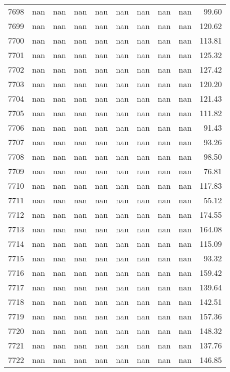\begin{tabular}{lrrrrrrrrr}
7698 & nan & nan & nan & nan & nan & nan & nan & nan & 99.60 \\
7699 & nan & nan & nan & nan & nan & nan & nan & nan & 120.62 \\
7700 & nan & nan & nan & nan & nan & nan & nan & nan & 113.81 \\
7701 & nan & nan & nan & nan & nan & nan & nan & nan & 125.32 \\
7702 & nan & nan & nan & nan & nan & nan & nan & nan & 127.42 \\
7703 & nan & nan & nan & nan & nan & nan & nan & nan & 120.20 \\
7704 & nan & nan & nan & nan & nan & nan & nan & nan & 121.43 \\
7705 & nan & nan & nan & nan & nan & nan & nan & nan & 111.82 \\
7706 & nan & nan & nan & nan & nan & nan & nan & nan & 91.43 \\
7707 & nan & nan & nan & nan & nan & nan & nan & nan & 93.26 \\
7708 & nan & nan & nan & nan & nan & nan & nan & nan & 98.50 \\
7709 & nan & nan & nan & nan & nan & nan & nan & nan & 76.81 \\
7710 & nan & nan & nan & nan & nan & nan & nan & nan & 117.83 \\
7711 & nan & nan & nan & nan & nan & nan & nan & nan & 55.12 \\
7712 & nan & nan & nan & nan & nan & nan & nan & nan & 174.55 \\
7713 & nan & nan & nan & nan & nan & nan & nan & nan & 164.08 \\
7714 & nan & nan & nan & nan & nan & nan & nan & nan & 115.09 \\
7715 & nan & nan & nan & nan & nan & nan & nan & nan & 93.32 \\
7716 & nan & nan & nan & nan & nan & nan & nan & nan & 159.42 \\
7717 & nan & nan & nan & nan & nan & nan & nan & nan & 139.64 \\
7718 & nan & nan & nan & nan & nan & nan & nan & nan & 142.51 \\
7719 & nan & nan & nan & nan & nan & nan & nan & nan & 157.36 \\
7720 & nan & nan & nan & nan & nan & nan & nan & nan & 148.32 \\
7721 & nan & nan & nan & nan & nan & nan & nan & nan & 137.76 \\
7722 & nan & nan & nan & nan & nan & nan & nan & nan & 146.85 \\

\end{tabular}

